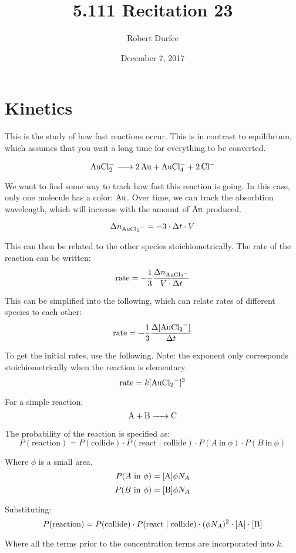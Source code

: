 \documentclass{article}
\title{ 5.111 Recitation 23 }
\author{ Robert Durfee }
\date{ December 7, 2017 }
\begin{document}
\maketitle

\section{ Kinetics }

This is the study of how fast reactions occur. This is in contrast to
equilibrium, which assumes that you wait a long time for everything to be
converted. 

$$ \ce{ AuCl^{-}_{2} -> 2Au + AuCl^{-}_{4} + 2Cl- } $$

We want to find some way to track how fast this reaction is going. In this case,
only one molecule has a color: $\ce{ Au }$. Over time, we can track the
absorbtion wavelength, which will increase with the amount of $\ce{ Au }$
produced. 

$$ \Delta n_{\ce{ AuCl_{2}^{-} }} = -3 \cdot \Delta t \cdot V $$

This can then be related to the other species stoichiometrically. The rate of
the reaction can be written:
$$ \mathrm{ rate } = -\frac{ 1 }{ 3 } \frac{ \Delta n_{\ce{ AuCl_{2}^{-} }} }{ V
\cdot \Delta t} $$

This can be simplified into the following, which can relate rates of different
species to each other:
$$ \mathrm{ rate } = -\frac{ 1 }{ 3 } \frac{ \Delta [ \ce{ AuCl_{2}^{-} } ] }{
\Delta t } $$

To get the initial rates, use the following. Note: the exponent only corresponds
stoichiometrically when the reaction is elementary.
$$ \mathrm{ rate } = k[ \ce{ AuCl_{2}^{-} } ]^{3} $$

For a simple reaction:
$$ \ce{ A + B -> C }$$

The probability of the reaction is specified as:
$$ P( \mathrm{ reaction } ) = P( \mathrm{ collide } ) \cdot P( \mathrm{ react
\mid collide } ) \cdot P( A\ \mathrm{ in }\ \phi ) \cdot P( B\ \mathrm{ in }\
\phi )$$

Where $\phi$ is a small area. 
$$ P( A\ \mathrm{ in }\ \phi ) = [ \ce{ A } ] \phi N_{A} $$
$$ P( B\ \mathrm{ in }\ \phi ) = [ \ce{ B } ] \phi N_{A} $$ 

Substituting:
$$ P( \mathrm{ reaction } ) = P( \mathrm{ collide } ) \cdot P( \mathrm{ react
\mid collide } ) \cdot ( \phi N_{A} )^{2} \cdot [ \ce{ A } ] \cdot [ \ce{ B } ]
$$

Where all the terms prior to the concentration terms are incorporated into $k$.
\end{document}
